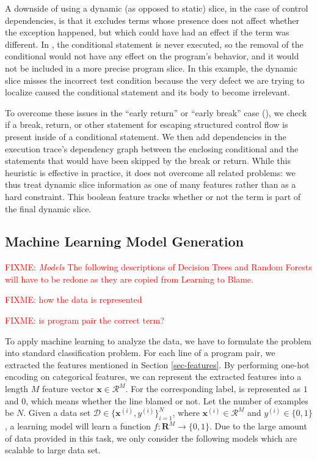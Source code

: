 \documentclass[conference]{IEEEtran}
\newcommand{\fixme}[1]{\textcolor{red}{FIXME: #1}}
\begin{document}
A downside of using a dynamic (as opposed to static) slice, in the case of
control dependencies, is that it excludes terms whose presence does not
affect whether the exception happened, but which could have had an effect
if the term was different. In
, the conditional statement is never
executed, so the removal of the conditional would not have any effect on
the program's behavior, and it would not be included in a more precise
program slice. In this example, the dynamic slice misses the incorrect
test condition because the very defect we are trying to localize
caused the conditional statement and its body to become irrelevant.

To overcome these issues in the ``early return'' or ``early break'' case
(), we check if a break, return, or other statement for
escaping structured control flow is present inside of a conditional
statement. We then add dependencies in the execution trace's dependency graph
between the enclosing conditional and the statements that would have been skipped
by the break or return. While this heuristic is effective in practice, it
does not overcome all related problems: we thus treat dynamic slice
information as one of many features rather than as a hard constraint.
This boolean feature tracks whether or not the term is part of the final
dynamic slice.

\subsection{Machine Learning Model Generation}
\label{sec-model}

\fixme{
\emph{Models} The following descriptions of Decision Trees and
Random Forests will have to be redone as they are copied from Learning to Blame.
}

\fixme{how the data is represented}

\fixme{is program pair the correct term?}

To apply machine learning to analyze the data, we have to formulate the 
problem into standard classification problem.
For each line of a program pair, we extracted the features mentioned in
Section \ref{sec-features}.
By performing one-hot encoding on categorical features, we can represent the
extracted features into a length $M$ feature vector $\mathbf{x} \in
\mathcal{R}^{M}$.
For the corresponding label, is represented as $1$ and $0$, which means whether
the line blamed or not.
Let the number of examples be $N$.
Given a data set $\mathcal{D} \in \{\mathbf{x}^{(i)}, y^{(i)}\}^{N}_{i=1}$,
where $\mathbf{x}^{(i)} \in \mathcal{R}^{M}$ and $y^{(i)} \in \{0, 1\}$,
a learning model will learn a function $f: \mathbf{R}^{M} \to \{0, 1\}$.
Due to the large amount of data provided in this task, we only consider the
following models which are scalable to large data set.
\end{document}
